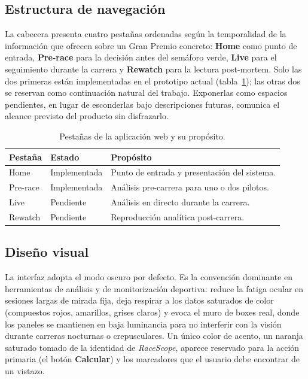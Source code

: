 \subsection{Estructura de navegación}
\label{ssec:web_pestanas}

La cabecera presenta cuatro pestañas ordenadas según la temporalidad de la información que ofrecen sobre un Gran Premio concreto: \textbf{Home} como punto de entrada, \textbf{Pre-race} para la decisión antes del semáforo verde, \textbf{Live} para el seguimiento durante la carrera y \textbf{Rewatch} para la lectura post-mortem. Solo las dos primeras están implementadas en el prototipo actual (tabla~\ref{tab:web_pestanas}); las otras dos se reservan como continuación natural del trabajo. Exponerlas como espacios pendientes, en lugar de esconderlas bajo descripciones futuras, comunica el alcance previsto del producto sin disfrazarlo.

\begin{table}[htbp]
\centering
\caption{Pestañas de la aplicación web y su propósito.}
\label{tab:web_pestanas}
\small
\begin{tabularx}{\textwidth}{llX}
\toprule
\textbf{Pestaña} & \textbf{Estado} & \textbf{Propósito} \\
\midrule
Home      & Implementada & Punto de entrada y presentación del sistema. \\
Pre-race  & Implementada & Análisis pre-carrera para uno o dos pilotos. \\
Live      & Pendiente    & Análisis en directo durante la carrera. \\
Rewatch   & Pendiente    & Reproducción analítica post-carrera. \\
\bottomrule
\end{tabularx}
\end{table}

\subsection{Diseño visual}
\label{ssec:web_ui}

La interfaz adopta el modo oscuro por defecto. Es la convención dominante en herramientas de análisis y de monitorización deportiva: reduce la fatiga ocular en sesiones largas de mirada fija, deja respirar a los datos saturados de color (compuestos rojos, amarillos, grises claros) y evoca el muro de boxes real, donde los paneles se mantienen en baja luminancia para no interferir con la visión durante carreras nocturnas o crepusculares. Un único color de acento, un naranja saturado tomado de la identidad de \textit{RaceScope}, aparece reservado para la acción primaria (el botón \textbf{Calcular}) y los marcadores que el usuario debe encontrar de un vistazo.

